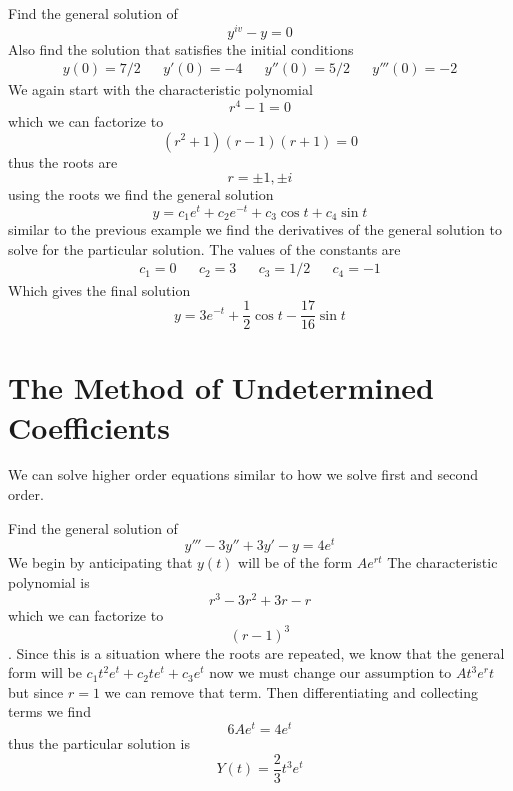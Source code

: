 \begin{example}
Find the general solution of \[ y^{iv} - y = 0 \] Also find the solution that satisfies the initial conditions 
\begin{align*}
y(0) = 7/2 && y'(0) = -4 && y''(0)= 5/2 && y'''(0) = -2
\end{align*}
We again start with the characteristic polynomial $$ r^4 - 1 =0 $$ which we can factorize to $$ (r^2 + 1)(r-1)(r+1) = 0 $$ thus the roots are \[ r = \pm 1, \pm i \] using the roots we find the general solution 
\[y = c_1 e^t  + c_2 e^{-t} + c_3\cos t + c_4 \sin t\] similar to the previous example we find the derivatives of the general solution to solve for the particular solution. The values of the constants are \begin{align*}
c_1 = 0 && c_2 = 3 && c_3 = 1/2 && c_4 = -1
\end{align*}
Which gives the final solution
\[ y = 3e^{-t} + \dfrac{1}{2} \cos t - \dfrac{17}{16} \sin t\]
\end{example}

\section{The Method of Undetermined Coefficients}
We can solve higher order equations similar to how we solve first and second order. 
\begin{example}
	Find the general solution of \[ y''' - 3y'' + 3y' - y = 4e^t \]
	We begin by anticipating that $ y(t) $ will be of the form $ Ae^{rt} $ The characteristic polynomial is \[ r^3 - 3r^2 + 3r - r \] which we can factorize to \[ (r-1)^3 \]. Since this is a situation where the roots are repeated, we know that the general form will be 
	$ c_1 t^2 e^t + c_2 t e^t + c_3 e^t $ now we must change our assumption to $ At^3 e^rt $ but since $ r = 1 $ we can remove that term. Then differentiating and collecting terms we find \[ 6Ae^t = 4e^t \] thus the particular solution is \[ Y(t) = \dfrac{2}{3}t^3e^t \]
\end{example}
\theoremstyle{definition}

